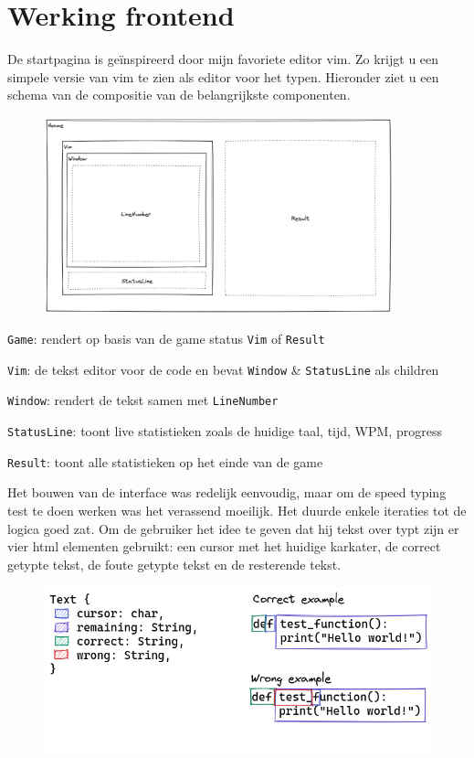 \clearpage

\section{Werking frontend}

De startpagina is geïnspireerd door mijn favoriete editor vim. Zo krijgt u een simpele versie van
vim te zien als editor voor het typen. Hieronder ziet u een schema van de compositie van de
belangrijkste componenten.

\begin{figure}[h]
  \centering
  \includegraphics[width=0.9\textwidth]{./figures/components.png}
\end{figure}

\texttt{Game}: rendert op basis van de game status \texttt{Vim} of
\texttt{Result} 

\texttt{Vim}: de tekst editor voor de code en bevat \texttt{Window} \&
\texttt{StatusLine} als children 

\texttt{Window}: rendert de tekst samen met \texttt{LineNumber} 

\texttt{StatusLine}: toont live statistieken zoals de huidige taal, tijd, WPM, progress 

\texttt{Result}: toont alle statistieken op het einde van de game

Het bouwen van de interface was redelijk eenvoudig, maar om de speed typing test te doen werken was
het verassend moeilijk. Het duurde enkele iteraties tot de logica goed zat. Om de gebruiker het idee
te geven dat hij tekst over typt zijn er vier html elementen gebruikt: een cursor met het huidige
karkater, de correct getypte tekst, de foute getypte tekst en de resterende tekst.

\begin{figure}
  \includegraphics[width=\linewidth]{./figures/text.png}
\end{figure}

